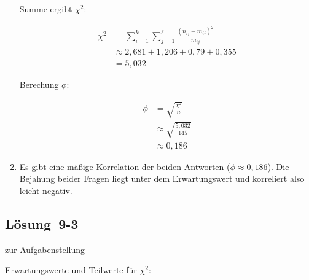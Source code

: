 \documentclass[
  11pt,
  ngerman,
  a4paper,
]{report}
\begin{document}
\begin{enumerate}
  Summe ergibt \(\chi^2\):

  \[
   \begin{aligned}
   \chi^2&= \sum_{i=1}^{k}\sum_{j=1}^{\ell}\frac{(n_{ij}-m_{ij})^{2}}{m_{ij}}\\[4pt]
         &\approx2{,}681+1{,}206+0{,}79+0{,}355\\
         &=5{,}032
   \end{aligned}
   \]

  Berechung \(\phi\):

  \[
   \begin{aligned}
   \phi&=\sqrt{\frac{\chi^2}{n}}\\[6pt]
       &\approx\sqrt{\frac{5{,}032}{145}}\\[4pt]
       &\approx0{,}186
   \end{aligned}
   \]
\item
  Es gibt eine mäßige Korrelation der beiden Antworten (\(\phi\approx0{,}186\)). Die Bejahung beider Fragen liegt unter dem Erwartungswert und korreliert also leicht negativ.
\end{enumerate}

\hypertarget{loesung-9-3}{%
\subsection{Lösung~9-3}\label{loesung-9-3}}

\protect\hyperlink{aufgabe-9-3}{zur Aufgabenstellung}

Erwartungswerte und Teilwerte für \(\chi^2\):
\end{document}
